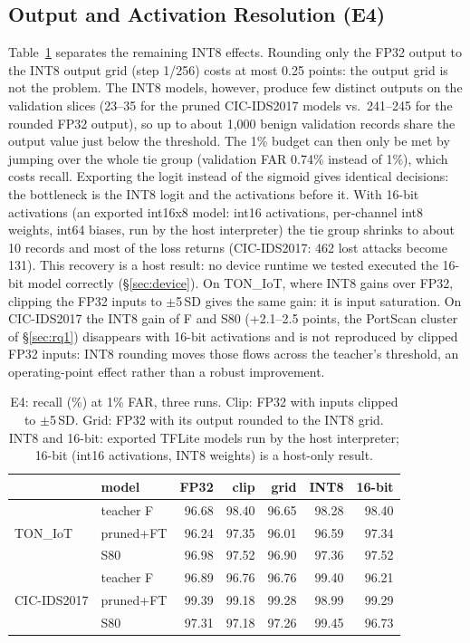 \documentclass[sigplan,10pt,review,anonymous,nonacm]{acmart}
\newcommand{\cic}{CIC-IDS2017\xspace}
\newcommand{\ton}{TON\_IoT\xspace}
\begin{document}
\subsection{Output and Activation Resolution (E4)}\label{sec:e4}
Table~\ref{tab:e4} separates the remaining INT8 effects. Rounding only the FP32 output to the INT8
output grid (step 1/256) costs at most 0.25 points: the output grid is not the problem. The INT8 models,
however, produce few distinct outputs on the validation slices (23--35 for the pruned \cic models vs.\
241--245 for the rounded FP32 output), so up to about 1,000 benign validation records share the output
value just below the threshold. The 1\% budget can then only be met by jumping over the whole tie group
(validation FAR 0.74\% instead of 1\%), which costs recall. Exporting the logit instead of the sigmoid
gives identical decisions: the bottleneck is the INT8 logit and the activations before it. With 16-bit
activations (an exported int16x8 model: int16 activations, per-channel int8 weights, int64 biases, run by
the host interpreter) the tie group shrinks to about 10 records and most of the loss returns (\cic: 462
lost attacks become 131). This recovery is a host result: no device runtime we tested executed the
16-bit model correctly (\S\ref{sec:device}). On \ton, where INT8 gains over FP32, clipping the FP32 inputs to
$\pm$5\,SD gives the same gain: it is input saturation. On \cic the INT8 gain of F and S80 (+2.1--2.5 points,
the PortScan cluster of \S\ref{sec:rq1}) disappears with 16-bit activations and is not reproduced by
clipped FP32 inputs: INT8 rounding moves those flows across the teacher's threshold, an operating-point
effect rather than a robust improvement.

\begin{table}[t]
\caption{E4: recall (\%) at 1\% FAR, three runs. Clip: FP32 with inputs clipped to $\pm$5\,SD. Grid:
FP32 with its output rounded to the INT8 grid. INT8 and 16-bit: exported TFLite models run by the host
interpreter; 16-bit (int16 activations, INT8 weights) is a host-only result.}
\label{tab:e4}
\small\setlength{\tabcolsep}{3pt}
\begin{tabular}{llrrrrr}
\toprule
 & model & FP32 & clip & grid & INT8 & 16-bit \\
\midrule
\multirow{3}{*}{\ton} & teacher F & 96.68 & 98.40 & 96.65 & 98.28 & 98.40 \\
 & pruned+FT & 96.24 & 97.35 & 96.01 & 96.59 & 97.34 \\
 & S80 & 96.98 & 97.52 & 96.90 & 97.36 & 97.52 \\
\midrule
\multirow{3}{*}{\cic} & teacher F & 96.89 & 96.76 & 96.76 & 99.40 & 96.21 \\
 & pruned+FT & 99.39 & 99.18 & 99.28 & 98.99 & 99.29 \\
 & S80 & 97.31 & 97.18 & 97.26 & 99.45 & 96.73 \\
\bottomrule
\end{tabular}
\end{table}
\end{document}
